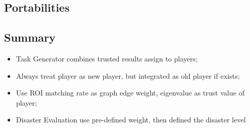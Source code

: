 \subsection{Portabilities}


\subsection{Summary}

    \begin{itemize}
      \item Task Generator combines trusted results assign to players;
      \item Always treat player as new player, but integrated as old player if exists;
      \item Use ROI matching rate as graph edge weight, eigenvalue as trust value of player;
      \item Disaster Evaluation use pre-defined weight, then defined the disaster level
    \end{itemize}
